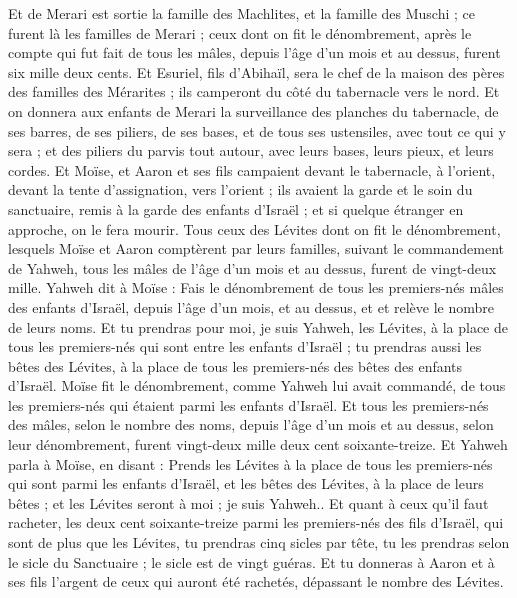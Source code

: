 \begin{multicols}{2}
Et de Merari est sortie la famille des Machlites, et la famille des Muschi ; ce furent là les familles de Merari ;
ceux dont on fit le dénombrement, après le compte qui fut fait de tous les mâles, depuis l'âge d'un mois et au dessus, furent six mille deux cents.
Et Esuriel, fils d'Abihaïl, sera le chef de la maison des pères des familles des Mérarites ; ils camperont du côté du tabernacle vers le nord.
Et on donnera aux enfants de Merari la surveillance des planches du tabernacle, de ses barres, de ses piliers, de ses bases, et de tous ses ustensiles, avec tout ce qui y sera ;
et des piliers du parvis tout autour, avec leurs bases, leurs pieux, et leurs cordes.
Et Moïse, et Aaron et ses fils campaient devant le tabernacle, à l'orient, devant la tente d'assignation, vers l'orient ; ils avaient la garde et le soin du sanctuaire, remis à la garde des enfants d'Israël ; et si quelque étranger en approche, on le fera mourir.
Tous ceux des Lévites dont on fit le dénombrement, lesquels Moïse et Aaron comptèrent par leurs familles, suivant le commandement de Yahweh, tous les mâles de l'âge d'un mois et au dessus, furent de vingt-deux mille.
Yahweh dit à Moïse : Fais le dénombrement de tous les premiers-nés mâles des enfants d'Israël, depuis l'âge d'un mois, et au dessus, et et relève le nombre de leurs noms.
Et tu prendras pour moi, je suis Yahweh, les Lévites, à la place de tous les premiers-nés qui sont entre les enfants d'Israël ; tu prendras aussi les bêtes des Lévites, à la place de tous les premiers-nés des bêtes des enfants d'Israël.
Moïse fit le dénombrement, comme Yahweh lui avait commandé, de tous les premiers-nés qui étaient parmi les enfants d'Israël.
Et tous les premiers-nés des mâles, selon le nombre des noms, depuis l'âge d'un mois et au dessus, selon leur dénombrement, furent vingt-deux mille deux cent soixante-treize.
Et Yahweh parla à Moïse, en disant :
Prends les Lévites à la place de tous les premiers-nés qui sont parmi les enfants d'Israël, et les bêtes des Lévites, à la place de leurs bêtes ; et les Lévites seront à moi ; je suis Yahweh..
Et quant à ceux qu'il faut racheter, les deux cent soixante-treize parmi les premiers-nés des fils d'Israël, qui sont de plus que les Lévites,
tu prendras cinq sicles par tête, tu les prendras selon le sicle du Sanctuaire ; le sicle est de vingt guéras.
Et tu donneras à Aaron et à ses fils l'argent de ceux qui auront été rachetés, dépassant le nombre des Lévites.

\end{multicols}
